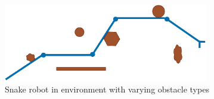 \begin{figure}
    \centering
    \includegraphics[width=0.8\textwidth]{figures/theory/weird-environment.pdf}
    \caption{Snake robot in environment with varying obstacle types}
    \label{fig:weird-env}
\end{figure}


